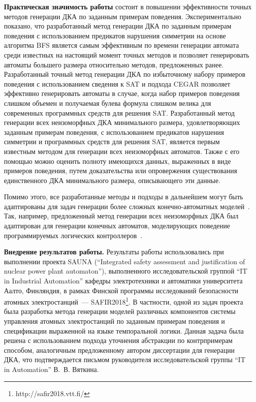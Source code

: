 \textbf{Практическая значимость работы} состоит в повышении эффективности точных методов генерации ДКА по заданным примерам поведения. 
Экспериментально показано, что разработанный метод генерации ДКА по заданным примерам поведения с использованием предикатов нарушения симметрии на основе алгоритма BFS является самым эффективным по времени генерации автомата среди известных на настоящий момент точных методов и позволяет генерировать автоматы большего размера относительно методов, предложенных ранее.
Разработанный точный метод генерации ДКА по избыточному набору примеров поведения с использованием сведения к SAT и подхода CEGAR позволяет эффективно генерировать автоматы в случае, когда набор примеров поведения слишком объемен и получаемая булева формула слишком велика для современных программных средств для решения SAT.
Разработанный метод генерации всех неизоморфных ДКА минимального размера, удовлетворяющих заданным примерам поведения, с использованием предикатов нарушения симметрии и программных средств для решения SAT, является первым известным методом для генерации всех неизоморфных автоматов.
Также с его помощью можно оценить полноту имеющихся данных, выраженных в виде примеров поведения, путем доказательства или опровержения существования единственного ДКА минимального размера, описывающего эти данные.

Помимо этого, все разработанные методы и подходы в дальнейшем могут быть адаптированы для задач генерации более сложных конечно-автоматных моделей~\cite{ulyantsev-phd-13}.
Так, например, предложенный метод генерации всех неизоморфных ДКА был адаптирован для генерации конечных автоматов, моделирующих поведение программируемых логических контроллеров~\cite{DBLP:journals/tii/ChivilikhinPCCV20}.

\textbf{Внедрение результатов работы.}
Результаты работы использовались при выполнении проекта SAUNA (``Integrated safety assessment and justification of nuclear power plant automaton''), выполненного исследовательской группой ``IT in Industrial Automation'' кафедры электротехники и автоматики университета Аалто, Финляндия, в рамках Финской программы исследований безопасности атомных электростанций~--- SAFIR2018\footnote{http://safir2018.vtt.fi/}.
В частности, одной из задач проекта была разработка метода генерации моделей различных компонентов системы управления атомных электростанций по заданным примерам поведения и спецификации выраженной на языке темпоральной логики.
Данная задача была решена с использованием подхода уточнения абстракции по контрпримерам способом, аналогичным предложенному автором диссертации для генерации ДКА, что подтверждается письмом руководителя исследовательской группы ``IT in Automation'' В.~В. Вяткина.

